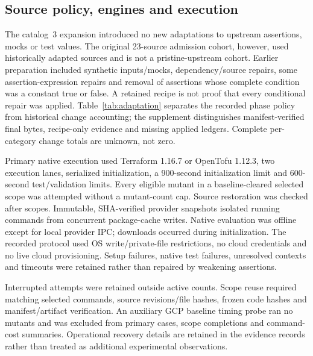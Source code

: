 \subsection{Source policy, engines and execution}\label{sec:adaptation}
The catalog~3 expansion introduced no new adaptations to upstream assertions, mocks or test values. The original 23-source admission cohort, however, used historically adapted sources and is not a pristine-upstream cohort. Earlier preparation included synthetic inputs/mocks, dependency/source repairs, some assertion-expression repairs and removal of assertions whose complete condition was a constant true or false. A retained recipe is not proof that every conditional repair was applied. Table~\ref{tab:adaptation} separates the recorded phase policy from historical change accounting; the supplement distinguishes manifest-verified final bytes, recipe-only evidence and missing applied ledgers. Complete per-category change totals are unknown, not zero.


Primary native execution used Terraform 1.16.7 or OpenTofu 1.12.3, two execution lanes, serialized initialization, a 900-second initialization limit and 600-second test/validation limits. Every eligible mutant in a baseline-cleared selected scope was attempted without a mutant-count cap. Source restoration was checked after scopes. Immutable, SHA-verified provider snapshots isolated running commands from concurrent package-cache writes. Native evaluation was offline except for local provider IPC; downloads occurred during initialization. The recorded protocol used OS write/private-file restrictions, no cloud credentials and no live cloud provisioning. Setup failures, native test failures, unresolved contexts and timeouts were retained rather than repaired by weakening assertions.

Interrupted attempts were retained outside active counts. Scope reuse required matching selected commands, source revisions/file hashes, frozen code hashes and manifest/artifact verification. An auxiliary GCP baseline timing probe ran no mutants and was excluded from primary cases, scope completions and command-cost summaries. Operational recovery details are retained in the evidence records rather than treated as additional experimental observations.

